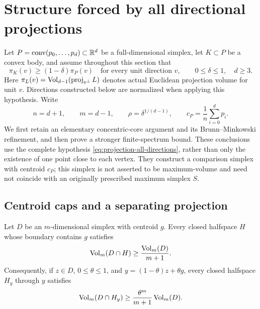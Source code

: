 \section{Structure forced by all directional projections}
\label{sec:projection-structure}
\label{sec:projection}

Let $P=\operatorname{conv}(p_0,\ldots,p_d)\subset\mathbb R^d$ be a full-dimensional
simplex, let $K\subset P$ be a convex body, and assume throughout this
section that
\begin{equation}
 \pi_K(v)\geq (1-\delta)\pi_P(v)
 \quad\text{for every unit direction }v,
 \qquad 0\leq\delta\leq1,\quad d\geq3.
 \label{eq:projection-all-directions}
\end{equation}
Here $\pi_L(v)=\operatorname{Vol}_{d-1}(\operatorname{proj}_{v^\perp}L)$ denotes
actual Euclidean projection volume for unit $v$.  Directions constructed below
are normalized when applying this hypothesis.  Write
\[
 n=d+1,\qquad m=d-1,\qquad \rho=\delta^{1/(d-1)},
 \qquad c_P=\frac1n\sum_{i=0}^d p_i.
\]
We first retain an elementary concentric-core argument and its
Brunn--Minkowski refinement, and then prove a stronger finite-spectrum
bound.  These conclusions use the complete hypothesis
\eqref{eq:projection-all-directions}, rather than only the existence of
one point close to each vertex.  They construct a comparison simplex
with centroid $c_P$; this simplex is not asserted to be maximum-volume
and need not coincide with an originally prescribed maximum simplex $S$.

\subsection{Centroid caps and a separating projection}

\begin{lemma}
\label{lem:projection-elementary-cap}
Let $D$ be an $m$-dimensional simplex with centroid $g$.  Every closed
halfspace $H$ whose boundary contains $g$ satisfies
\begin{equation}
 \operatorname{Vol}_m(D\cap H)\geq \frac{\operatorname{Vol}_m(D)}{m+1}.
 \label{eq:projection-elementary-cap}
\end{equation}
Consequently, if $z\in D$, $0\leq\theta\leq1$, and
$y=(1-\theta)z+\theta g$, every closed halfspace $H_y$ through $y$
satisfies
\begin{equation}
 \operatorname{Vol}_m(D\cap H_y)\geq
 \frac{\theta^m}{m+1}\operatorname{Vol}_m(D).
 \label{eq:projection-homothetic-cap}
\end{equation}
\end{lemma}

